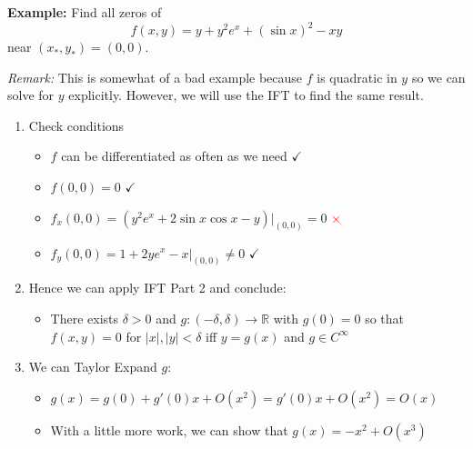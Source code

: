 \documentclass[12pt]{report}
\newcommand{\R}{\mathbb{R}}
\newcommand{\abs}[1]{\left\vert #1 \right\vert}
\newcommand*{\tbf}[1]{\ifmmode\mathbf{#1}\else\textbf{#1}\fi}
\begin{document}
\tbf{Example:} Find all zeros of
\[f(x, y) = y + y^2 e^x + (\sin x)^2 - xy\]
near $(x_*, y_*) = (0, 0)$.

\emph{Remark:} This is somewhat of a bad example because $f$ is quadratic in $y$ so we can solve for $y$ explicitly. However, we will use the IFT to find the same result.

\begin{enumerate}
    \item Check conditions

          \begin{itemize}
              \item $f$ can be differentiated as often as we need \quad \textcolor{mygreen}{$\checkmark$}
              \item $f(0, 0) = 0$ \quad \textcolor{mygreen}{$\checkmark$}
              \item $f_x(0, 0) = (y^2 e^x + 2\sin x \cos x - y) \bigg\vert_{(0, 0)} = 0$ \quad \textcolor{red}{$\times$}
              \item $f_y(0, 0) = 1 + 2y e^x - x \bigg\vert_{(0, 0)} \neq 0$ \quad \textcolor{mygreen}{$\checkmark$}
          \end{itemize}

    \item Hence we can apply IFT Part 2 and conclude:
          \begin{itemize}
              \item There exists $\delta > 0$ and $g: (- \delta, \delta) \to \R$ with $g(0) = 0$ so that $f(x, y) = 0$ for $\abs{x}, \abs{y} < \delta$ iff $y = g(x)$ and $g \in C^{\infty}$
          \end{itemize}

    \item We can Taylor Expand $g$:
          \begin{itemize}
              \item $g(x) = g(0) + g'(0)x + O(x^2) = g'(0)x + O(x^2) = O(x)$
              \item With a little more work, we can show that $g(x) = -x^2 + O(x^3)$
          \end{itemize}

          \begin{center}
          \end{center}
\end{enumerate}
\end{document}
